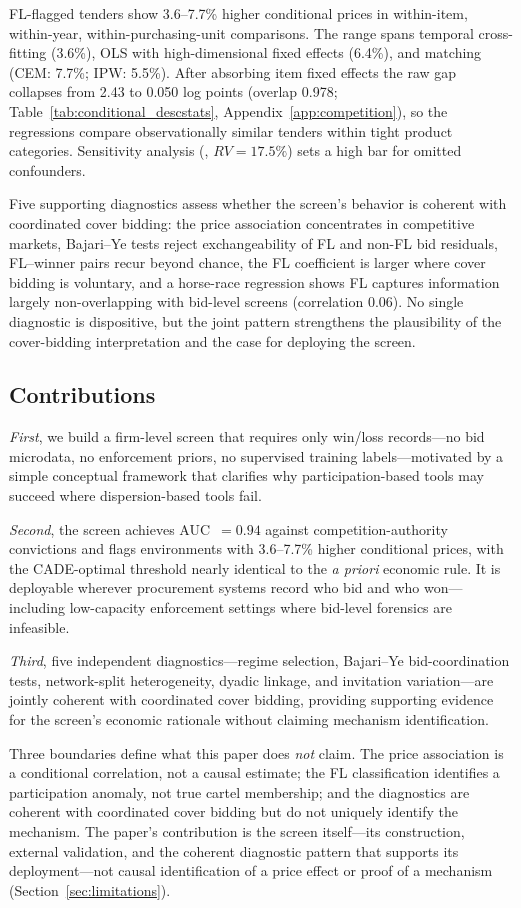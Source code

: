 FL-flagged tenders show 3.6--7.7\% higher conditional prices in
within-item, within-year, within-purchasing-unit comparisons. The
range spans temporal cross-fitting (3.6\%), OLS with high-dimensional
fixed effects (6.4\%), and matching (CEM: 7.7\%; IPW: 5.5\%). After
absorbing item fixed effects the raw gap collapses from 2.43 to 0.050
log points (overlap 0.978; Table~\ref{tab:conditional_descstats},
Appendix~\ref{app:competition}), so the regressions compare
observationally similar tenders within tight product categories.
Sensitivity analysis (\citealt{cinelli2020making},
$RV = 17.5\%$) sets a high bar for omitted confounders.

Five supporting diagnostics assess whether the screen's behavior is
coherent with coordinated cover bidding: the price association
concentrates in competitive markets, Bajari--Ye tests reject
exchangeability of FL and non-FL bid residuals, FL--winner pairs
recur beyond chance, the FL coefficient is larger where cover bidding
is voluntary, and a horse-race regression shows FL captures
information largely non-overlapping with bid-level screens (correlation
0.06). No single diagnostic is dispositive, but the joint pattern
strengthens the plausibility of the cover-bidding interpretation and
the case for deploying the screen.

\subsection{Contributions}

\emph{First}, we build a firm-level screen that requires only
win/loss records---no bid microdata, no enforcement priors, no
supervised training labels---motivated by a simple conceptual
framework that clarifies why participation-based tools may succeed
where dispersion-based tools fail.

\emph{Second}, the screen achieves AUC~$= 0.94$ against
competition-authority convictions and flags environments with
3.6--7.7\% higher conditional prices, with the CADE-optimal
threshold nearly identical to the \emph{a priori} economic rule.
It is deployable wherever procurement systems record who bid and
who won---including low-capacity enforcement settings where bid-level
forensics are infeasible.

\emph{Third}, five independent diagnostics---regime selection,
Bajari--Ye bid-coordination tests, network-split heterogeneity,
dyadic linkage, and invitation variation---are jointly coherent
with coordinated cover bidding, providing supporting evidence for
the screen's economic rationale without claiming mechanism
identification.

Three boundaries define what this paper does \emph{not} claim. The
price association is a conditional correlation, not a causal
estimate; the FL classification identifies a participation anomaly,
not true cartel membership; and the diagnostics are coherent with
coordinated cover bidding but do not uniquely identify the
mechanism. The paper's contribution is the screen itself---its
construction, external validation, and the coherent diagnostic
pattern that supports its deployment---not causal identification
of a price effect or proof of a mechanism
(Section~\ref{sec:limitations}).
